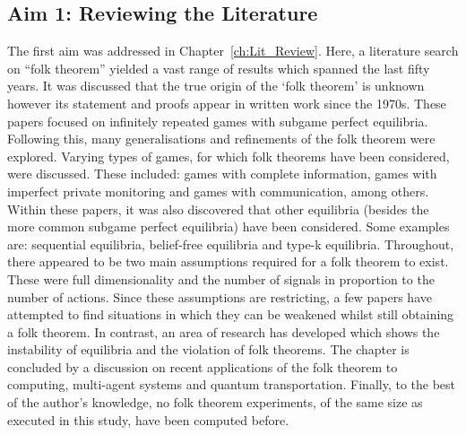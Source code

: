 \subsection{Aim 1: Reviewing the Literature}\label{subsec:Aim_1_concl}
The first aim was addressed in Chapter~\ref{ch:Lit_Review}. Here, a literature
search on ``folk theorem'' yielded a vast range of results which spanned the
last fifty years. It was discussed that the true origin of the `folk theorem' is
unknown however its statement and proofs appear in written work since the 1970s.
These papers focused on infinitely repeated games with subgame perfect
equilibria. Following this, many generalisations and refinements of the folk
theorem were explored. Varying types of games, for which folk theorems have been
considered, were discussed. These included: games with complete information,
games with imperfect private monitoring and games with communication, among
others. Within these papers, it was also discovered that other equilibria
(besides the more common subgame perfect equilibria) have been considered. Some
examples are: sequential equilibria, belief-free equilibria and type-k
equilibria. Throughout, there appeared to be two main assumptions required for a
folk theorem to exist. These were full dimensionality and the number of
signals in proportion to the number of actions. Since these assumptions are restricting, a few papers have attempted to find situations in which they
can be weakened whilst still obtaining a folk theorem. In contrast, an
area of research has developed which shows the instability of equilibria and
the violation of folk theorems. The chapter is concluded by a discussion on
recent applications of the folk theorem to computing, multi-agent systems and
quantum transportation. Finally, to the best of the author's knowledge, no folk
theorem experiments, of the same size as executed in this study, have been
computed before.

